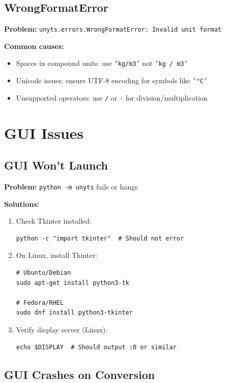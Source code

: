 \documentclass[11pt,a4paper]{report}
\begin{document}
\subsection{WrongFormatError}

\textbf{Problem:} \texttt{unyts.errors.WrongFormatError: Invalid unit format}

\textbf{Common causes:}
\begin{itemize}
\item Spaces in compound units: use \texttt{'kg/m3'} not \texttt{'kg / m3'}
\item Unicode issues: ensure UTF-8 encoding for symbols like \texttt{'°C'}
\item Unsupported operators: use \texttt{/} or \texttt{·} for division/multiplication
\end{itemize}

\section{GUI Issues}

\subsection{GUI Won't Launch}

\textbf{Problem:} \texttt{python -m unyts} fails or hangs

\textbf{Solutions:}
\begin{enumerate}
\item Check Tkinter installed:
\begin{lstlisting}[style=pythonstyle]
python -c "import tkinter"  # Should not error
\end{lstlisting}

\item On Linux, install Tkinter:
\begin{lstlisting}[style=pythonstyle]
# Ubuntu/Debian
sudo apt-get install python3-tk

# Fedora/RHEL
sudo dnf install python3-tkinter
\end{lstlisting}

\item Verify display server (Linux):
\begin{lstlisting}[style=pythonstyle]
echo $DISPLAY  # Should output :0 or similar
\end{lstlisting}
\end{enumerate}

\subsection{GUI Crashes on Conversion}
\end{document}
